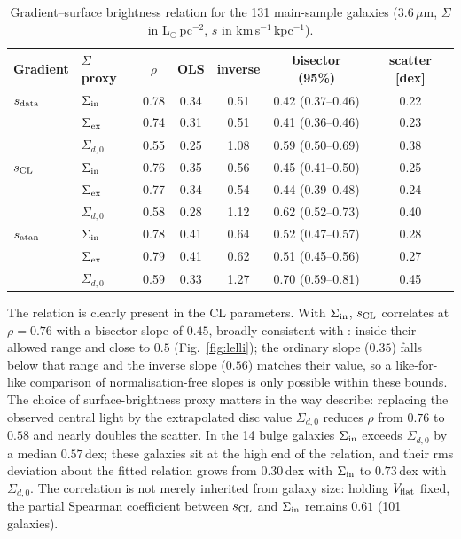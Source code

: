 \documentclass[11pt,a4paper]{article}
\newcommand{\sCL}{s_{\rm CL}}
\newcommand{\sat}{s_{\rm atan}}
\newcommand{\sdat}{s_{\rm data}}
\newcommand{\Sin}{\Sigma_{\rm in}}
\newcommand{\Vf}{V_{\rm flat}}
\newcommand{\kms}{km\,s$^{-1}$}
\begin{document}
\begin{table}[h]
\centering
\caption{Gradient--surface brightness relation for the 131 main-sample galaxies (3.6\,$\mu$m, $\Sigma$ in L$_\odot$\,pc$^{-2}$, $s$ in \kms\,kpc$^{-1}$).}
\label{tab:lelli}
\small
\begin{tabular}{llccccc}
\toprule
Gradient & $\Sigma$ proxy & $\rho$ & OLS & inverse & bisector (95\%) & scatter [dex]\\
\midrule
$\sdat$ & $\Sin$          & 0.78 & 0.34 & 0.51 & 0.42 (0.37--0.46) & 0.22\\
        & $\Sigma_{\rm ex}$ & 0.74 & 0.31 & 0.51 & 0.41 (0.36--0.46) & 0.23\\
        & $\Sigma_{d,0}$ & 0.55 & 0.25 & 1.08 & 0.59 (0.50--0.69) & 0.38\\
\midrule
$\sCL$  & $\Sin$          & 0.76 & 0.35 & 0.56 & 0.45 (0.41--0.50) & 0.25\\
        & $\Sigma_{\rm ex}$ & 0.77 & 0.34 & 0.54 & 0.44 (0.39--0.48) & 0.24\\
        & $\Sigma_{d,0}$ & 0.58 & 0.28 & 1.12 & 0.62 (0.52--0.73) & 0.40\\
\midrule
$\sat$  & $\Sin$          & 0.78 & 0.41 & 0.64 & 0.52 (0.47--0.57) & 0.28\\
        & $\Sigma_{\rm ex}$ & 0.79 & 0.41 & 0.62 & 0.51 (0.45--0.56) & 0.27\\
        & $\Sigma_{d,0}$ & 0.59 & 0.33 & 1.27 & 0.70 (0.59--0.81) & 0.45\\
\bottomrule
\end{tabular}
\end{table}

The relation is clearly present in the CL parameters. With $\Sin$, $\sCL$ correlates at $\rho=0.76$ with a bisector slope of $0.45$, broadly consistent with \citet{Lelli2013}: inside their allowed range and close to $0.5$ (Fig.~\ref{fig:lelli}); the ordinary slope ($0.35$) falls below that range and the inverse slope ($0.56$) matches their value, so a like-for-like comparison of normalisation-free slopes is only possible within these bounds. The choice of surface-brightness proxy matters in the way \citet{Lelli2013} describe: replacing the observed central light by the extrapolated disc value $\Sigma_{d,0}$ reduces $\rho$ from $0.76$ to $0.58$ and nearly doubles the scatter. In the 14 bulge galaxies $\Sin$ exceeds $\Sigma_{d,0}$ by a median $0.57$\,dex; these galaxies sit at the high end of the relation, and their rms deviation about the fitted relation grows from $0.30$\,dex with $\Sin$ to $0.73$\,dex with $\Sigma_{d,0}$. The correlation is not merely inherited from galaxy size: holding $\Vf$ fixed, the partial Spearman coefficient between $\sCL$ and $\Sin$ remains $0.61$ (101 galaxies).
\end{document}
